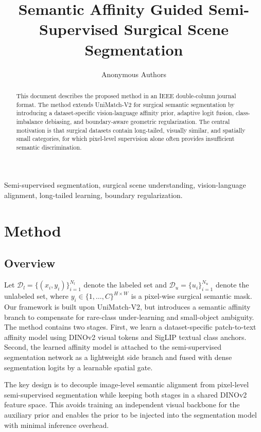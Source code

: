 \documentclass[journal,twoside]{IEEEtran}
\begin{document}
\title{Semantic Affinity Guided Semi-Supervised Surgical Scene Segmentation}

\author{Anonymous Authors}

\maketitle

\begin{abstract}
This document describes the proposed method in an IEEE double-column journal format. The method extends UniMatch-V2 for surgical semantic segmentation by introducing a dataset-specific vision-language affinity prior, adaptive logit fusion, class-imbalance debiasing, and boundary-aware geometric regularization. The central motivation is that surgical datasets contain long-tailed, visually similar, and spatially small categories, for which pixel-level supervision alone often provides insufficient semantic discrimination.
\end{abstract}

\begin{IEEEkeywords}
Semi-supervised segmentation, surgical scene understanding, vision-language alignment, long-tailed learning, boundary regularization.
\end{IEEEkeywords}

\section{Method}

\subsection{Overview}
Let $\mathcal{D}_l=\{(x_i,y_i)\}_{i=1}^{N_l}$ denote the labeled set and $\mathcal{D}_u=\{u_i\}_{i=1}^{N_u}$ denote the unlabeled set, where $y_i \in \{1,\ldots,C\}^{H\times W}$ is a pixel-wise surgical semantic mask. Our framework is built upon UniMatch-V2, but introduces a semantic affinity branch to compensate for rare-class under-learning and small-object ambiguity. The method contains two stages. First, we learn a dataset-specific patch-to-text affinity model using DINOv2 visual tokens and SigLIP textual class anchors. Second, the learned affinity model is attached to the semi-supervised segmentation network as a lightweight side branch and fused with dense segmentation logits by a learnable spatial gate.

The key design is to decouple image-level semantic alignment from pixel-level semi-supervised segmentation while keeping both stages in a shared DINOv2 feature space. This avoids training an independent visual backbone for the auxiliary prior and enables the prior to be injected into the segmentation model with minimal inference overhead.
\end{document}
